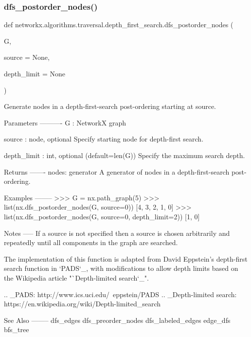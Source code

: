 \subsubsection{\texorpdfstring{dfs\+\_\+postorder\+\_\+nodes()}{dfs\_postorder\_nodes()}}
{\footnotesize\ttfamily def networkx.\+algorithms.\+traversal.\+depth\+\_\+first\+\_\+search.\+dfs\+\_\+postorder\+\_\+nodes (\begin{DoxyParamCaption}\item[{}]{G,  }\item[{}]{source = {\ttfamily None},  }\item[{}]{depth\+\_\+limit = {\ttfamily None} }\end{DoxyParamCaption})}

\begin{DoxyVerb}Generate nodes in a depth-first-search post-ordering starting at source.

Parameters
----------
G : NetworkX graph

source : node, optional
   Specify starting node for depth-first search.

depth_limit : int, optional (default=len(G))
   Specify the maximum search depth.

Returns
-------
nodes: generator
   A generator of nodes in a depth-first-search post-ordering.

Examples
--------
>>> G = nx.path_graph(5)
>>> list(nx.dfs_postorder_nodes(G, source=0))
[4, 3, 2, 1, 0]
>>> list(nx.dfs_postorder_nodes(G, source=0, depth_limit=2))
[1, 0]

Notes
-----
If a source is not specified then a source is chosen arbitrarily and
repeatedly until all components in the graph are searched.

The implementation of this function is adapted from David Eppstein's
depth-first search function in `PADS`_, with modifications
to allow depth limits based on the Wikipedia article
"`Depth-limited search`_".

.. _PADS: http://www.ics.uci.edu/~eppstein/PADS
.. _Depth-limited search: https://en.wikipedia.org/wiki/Depth-limited_search

See Also
--------
dfs_edges
dfs_preorder_nodes
dfs_labeled_edges
edge_dfs
bfs_tree
\end{DoxyVerb}
 \mbox{\label{namespacenetworkx_1_1algorithms_1_1traversal_1_1depth__first__search_ae7e55ac497ad0fd8784b6a9e52142812}} 

